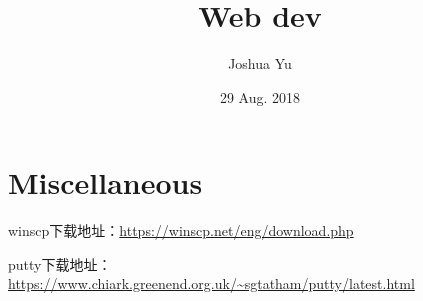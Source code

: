 \documentclass[a4paper, 12pt]{article}
\begin{document}

\large
\title{Web dev}
\author{Joshua Yu}
\date{29 Aug. 2018}
\maketitle
\tableofcontents


\section{Miscellaneous}
winscp下载地址：\url{https://winscp.net/eng/download.php}

putty下载地址：\url{https://www.chiark.greenend.org.uk/~sgtatham/putty/latest.html}
\end{document}
